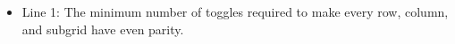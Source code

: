 \begin{itemize}
	\item      Line 1: The minimum number of toggles required to make every row,         column, and subgrid have even parity.    
\end{itemize}